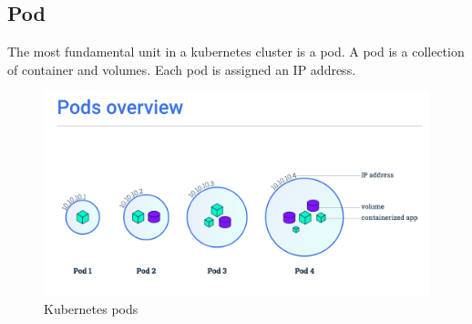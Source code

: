 \documentclass[12pt]{report}
\begin{document}
\subsection{Pod}
The most fundamental unit in a kubernetes cluster is a pod. A pod is a collection of container and volumes. Each pod is assigned an IP address.\\
\begin{figure}[h!]
	\begin{center}
		\includegraphics[width=\textwidth, trim= 0 0 0 7cm, clip=true]{pods}
		\caption{Kubernetes pods \cite{Pods}}
	\end{center}
\end{figure}
\end{document}
